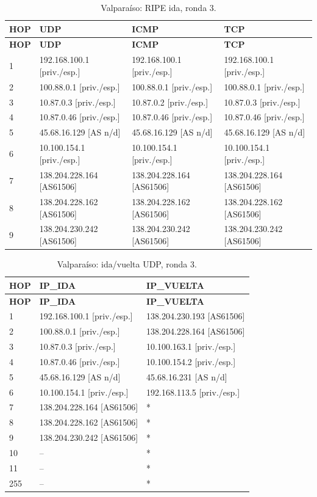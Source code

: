 \begin{longtable}{p{0.95cm}p{4.716666666666667cm}p{4.716666666666667cm}p{4.716666666666667cm}}
\caption{Valparaíso: RIPE ida, ronda 3.}\label{anexo:ripe:138.204.230.242:3} \\
\toprule
\textbf{HOP} & \textbf{UDP} & \textbf{ICMP} & \textbf{TCP} \\ \midrule
\endfirsthead
\toprule
\textbf{HOP} & \textbf{UDP} & \textbf{ICMP} & \textbf{TCP} \\ \midrule
\endhead
1 & 192.168.100.1 [priv./esp.] & 192.168.100.1 [priv./esp.] & 192.168.100.1 [priv./esp.] \\
2 & 100.88.0.1 [priv./esp.] & 100.88.0.1 [priv./esp.] & 100.88.0.1 [priv./esp.] \\
3 & 10.87.0.3 [priv./esp.] & 10.87.0.2 [priv./esp.] & 10.87.0.3 [priv./esp.] \\
4 & 10.87.0.46 [priv./esp.] & 10.87.0.46 [priv./esp.] & 10.87.0.46 [priv./esp.] \\
5 & 45.68.16.129 [AS n/d] & 45.68.16.129 [AS n/d] & 45.68.16.129 [AS n/d] \\
6 & 10.100.154.1 [priv./esp.] & 10.100.154.1 [priv./esp.] & 10.100.154.1 [priv./esp.] \\
7 & 138.204.228.164 [AS61506] & 138.204.228.164 [AS61506] & 138.204.228.164 [AS61506] \\
8 & 138.204.228.162 [AS61506] & 138.204.228.162 [AS61506] & 138.204.228.162 [AS61506] \\
9 & 138.204.230.242 [AS61506] & 138.204.230.242 [AS61506] & 138.204.230.242 [AS61506] \\
\bottomrule
\end{longtable}
\endgroup
\begingroup
\fontsize{9}{11}\selectfont
\begin{longtable}{p{0.95cm}p{7.075cm}p{7.075cm}}
\caption{Valparaíso: ida/vuelta UDP, ronda 3.}\label{anexo:vuelta:138.204.230.242:UDP:3} \\
\toprule
\textbf{HOP} & \textbf{IP\_\allowbreak{}IDA} & \textbf{IP\_\allowbreak{}VUELTA} \\ \midrule
\endfirsthead
\toprule
\textbf{HOP} & \textbf{IP\_\allowbreak{}IDA} & \textbf{IP\_\allowbreak{}VUELTA} \\ \midrule
\endhead
1 & 192.168.100.1 [priv./esp.] & 138.204.230.193 [AS61506] \\
2 & 100.88.0.1 [priv./esp.] & 138.204.228.164 [AS61506] \\
3 & 10.87.0.3 [priv./esp.] & 10.100.163.1 [priv./esp.] \\
4 & 10.87.0.46 [priv./esp.] & 10.100.154.2 [priv./esp.] \\
5 & 45.68.16.129 [AS n/d] & 45.68.16.231 [AS n/d] \\
6 & 10.100.154.1 [priv./esp.] & 192.168.113.5 [priv./esp.] \\
7 & 138.204.228.164 [AS61506] & * \\
8 & 138.204.228.162 [AS61506] & * \\
9 & 138.204.230.242 [AS61506] & * \\
10 & -- & * \\
11 & -- & * \\
255 & -- & * \\
\bottomrule
\end{longtable}
